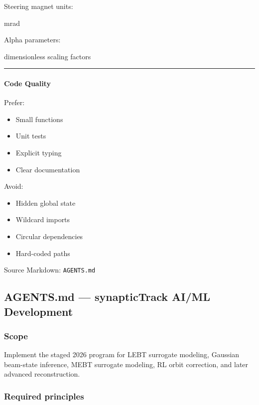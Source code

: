 \documentclass[
]{article}
\providecommand{\tightlist}{%
  \setlength{\itemsep}{0pt}\setlength{\parskip}{0pt}}
\begin{document}
Steering magnet units:

mrad

Alpha parameters:

dimensionless scaling factors

\begin{center}\rule{0.5\linewidth}{0.5pt}\end{center}

\hypertarget{code-quality}{%
\paragraph{Code Quality}\label{code-quality}}

Prefer:

\begin{itemize}
\tightlist
\item
  Small functions
\item
  Unit tests
\item
  Explicit typing
\item
  Clear documentation
\end{itemize}

Avoid:

\begin{itemize}
\tightlist
\item
  Hidden global state
\item
  Wildcard imports
\item
  Circular dependencies
\item
  Hard-coded paths
\end{itemize}

Source Markdown: \texttt{AGENTS.md}

\hypertarget{agents.md-synaptictrack-aiml-development}{%
\subsection{AGENTS.md --- synapticTrack AI/ML
Development}\label{agents.md-synaptictrack-aiml-development}}

\hypertarget{scope}{%
\subsubsection{Scope}\label{scope}}

Implement the staged 2026 program for LEBT surrogate modeling, Gaussian
beam-state inference, MEBT surrogate modeling, RL orbit correction, and
later advanced reconstruction.

\hypertarget{required-principles}{%
\subsubsection{Required principles}\label{required-principles}}
\end{document}
